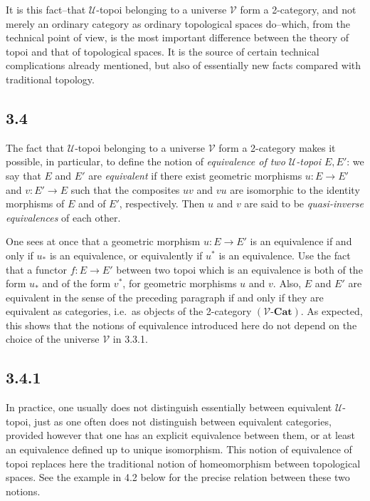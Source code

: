 \documentclass[11pt]{article}
\newcommand{\U}{\mathcal{U}}
\newcommand{\V}{\mathcal{V}}
\newcommand{\Cat}{\mathbf{Cat}}
\newcommand{\ie}{i.e.}
\begin{document}
It is this fact--that \(\U\)-topoi belonging to a universe \(\V\) form a 2-category, and not merely an ordinary category as ordinary topological spaces do--which, from the technical point of view, is the most important difference between the theory of topoi and that of topological spaces. It is the source of certain technical complications already mentioned, but also of essentially new facts compared with traditional topology.

\subsection*{3.4}
The fact that \(\U\)-topoi belonging to a universe \(\V\) form a 2-category makes it possible, in particular, to define the notion of \emph{equivalence of two \(\U\)-topoi \(E,E'\)}: we say that \(E\) and \(E'\) are \emph{equivalent} if there exist geometric morphisms \(u:E\to E'\) and \(v:E'\to E\) such that the composites \(uv\) and \(vu\) are isomorphic to the identity morphisms of \(E\) and of \(E'\), respectively. Then \(u\) and \(v\) are said to be \emph{quasi-inverse equivalences} of each other.

One sees at once that a geometric morphism \(u:E\to E'\) is an equivalence if and only if \(u_\ast\) is an equivalence, or equivalently if \(u^\ast\) is an equivalence. Use the fact that a functor \(f:E\to E'\) between two topoi which is an equivalence is both of the form \(u_\ast\) and of the form \(v^\ast\), for geometric morphisms \(u\) and \(v\). Also, \(E\) and \(E'\) are equivalent in the sense of the preceding paragraph if and only if they are equivalent as categories, \ie\ as objects of the 2-category \((\V\text{-}\Cat)\). As expected, this shows that the notions of equivalence introduced here do not depend on the choice of the universe \(\V\) in 3.3.1.

\subsection*{3.4.1}
In practice, one usually does not distinguish essentially between equivalent \(\U\)-topoi, just as one often does not distinguish between equivalent categories, provided however that one has an explicit equivalence between them, or at least an equivalence defined up to unique isomorphism. This notion of equivalence of topoi replaces here the traditional notion of homeomorphism between topological spaces. See the example in 4.2 below for the precise relation between these two notions.
\end{document}

